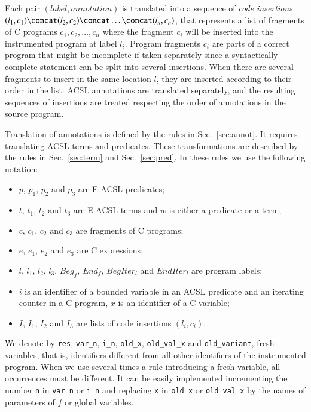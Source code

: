 Each pair
$(label, annotation)$ is translated into a sequence of \emph{code insertions} 
$(l_1, c_1) \concat (l_2, c_2) \concat \ldots \concat (l_n, c_n)$, that 
represents a list of fragments of C programs $c_1, c_2, \ldots, c_n$ where
the fragment $c_i$ will be inserted into the instrumented program at label
$l_i$. Program fragments $c_i$ are parts of a correct program that might be
incomplete if taken separately
since a syntactically complete statement can be split into several insertions.
When there are several fragments to insert in the same location $l$, they
are inserted according  to their order in the list. \textsc{ACSL} annotations
are translated separately, and the  resulting sequences of insertions are treated 
respecting the order of annotations in the source program.

Translation of annotations is defined by the rules in Sec.~\ref{sec:annot}. It
requires translating \textsc{ACSL} terms and predicates. These
transformations are described by the rules in Sec.~\ref{sec:term} and
Sec.~\ref{sec:pred}. In these rules we use the following notation:
\begin{itemize}
\item $p$, $p_1$, $p_2$ and $p_3$ are \textsc{E-ACSL} predicates;
\item $t$, $t_1$, $t_2$ and $t_3$ are \textsc{E-ACSL} terms and $w$ is either a
  predicate or a term;
\item $c$, $c_1$, $c_2$ and $c_3$ are fragments of C programs;
\item $e$, $e_1$, $e_2$ and $e_3$ are C expressions;
\item $l$, $l_1$, $l_2$, $l_3$, $Beg_f$, $End_f$, $BegIter_l$ and $EndIter_l$ are
  program labels;
\item $i$ is an identifier of a bounded variable in an \textsc{ACSL} predicate
  and an iterating counter in a C program, $x$ is an identifier of a C variable;
\item $I$, $I_1$, $I_2$ and $I_3$ are lists of code insertions $(l_i, c_i)$.
\end{itemize}



We denote by \lstinline'res', \lstinline'var_n', \lstinline'i_n',
\lstinline|old_x|, \lstinline'old_val_x' and \lstinline|old_variant|, fresh
variables, that is, identifiers different from all other identifiers of the
instrumented program.
When we use several times a rule introducing a fresh variable, all occurrences
must be different. It can be easily implemented incrementing the number
\lstinline'n' in \lstinline|var_n| or \lstinline'i_n' and replacing
\lstinline|x| in \lstinline|old_x| or \lstinline'old_val_x' by the
names of parameters of $f$ or global variables.


